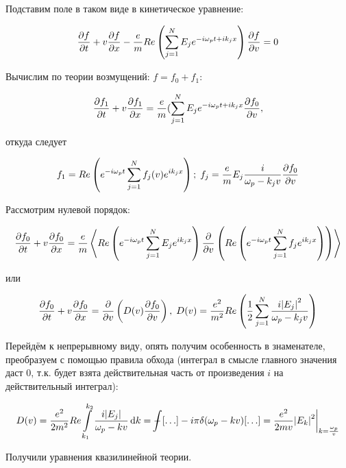 \documentclass[10pt, a4paper]{article}
\def\Xint#1{\mathchoice
 {\XXint\displaystyle\textstyle{#1}}%
 {\XXint\textstyle\scriptstyle{#1}}%
 {\XXint\scriptstyle\scriptscriptstyle{#1}}%
 {\XXint\scriptscriptstyle\scriptscriptstyle{#1}}%
 \!\int}
\def\XXint#1#2#3{{\setbox0=\hbox{$#1{#2#3}{\int}$}
   \vcenter{\hbox{$#2#3$}}\kern-.5\wd0}}
\def\dashint{\Xint-}
\begin{document}
Подставим поле в таком виде в кинетическое уравнение:

\begin{equation*}
	\pdv{f}{t} + v\pdv{f}{x} - \frac{e}{m}Re\left(\sum\limits_{j=1}^N E_je^{-i\omega_pt+ik_jx}\right)\pdv{f}{v} = 0
\end{equation*}

Вычислим по теории возмущений: $f = f_0 + f_1$:

\begin{equation*}
	\pdv{f_1}{t} + v\pdv{f_1}{x} = \frac{e}{m}(\sum\limits_{j=1}^N E_je^{-i\omega_pt+ik_jx}\pdv{f_0}{v},
\end{equation*}

откуда следует

\begin{equation*}
	f_1 = Re \left( e^{-i\omega_p t}\sum\limits_{j=1}^N f_j(v)e^{ik_jx} \right) ;\; f_j = \frac{e}{m}E_j\frac{i}{\omega_p-k_jv} \pdv{f_0}{v}
\end{equation*}

Рассмотрим нулевой порядок:

\begin{equation*}
	\pdv{f_0}{t} + v\pdv{f_0}{x} = \frac{e}{m}\left\langle Re\left( e^{-i\omega_p t}\sum\limits_{j=1}^N E_j e^{ik_jx} \right) \pdv{}{v} \left(Re\left(e^{-i\omega_p t}\sum\limits_{j=1}^N f_je^{ik_j x}\right)\right) \right\rangle 
\end{equation*}

или

\begin{equation*}
	\pdv{f_0}{t} + v\pdv{f_0}{x} = \pdv{}{v}\left(D(v)\pdv{f_0}{v}\right),\; D(v) = \frac{e^2}{m^2}Re\left(\frac{1}{2} \sum\limits_{j=1}^N\frac{i\abs{E_j}^2}{\omega_p-k_jv}\right)
\end{equation*}

Перейдём к непрерывному виду, опять получим особенность в знаменателе, преобразуем с помощью правила обхода (интеграл в смысле главного значения даст 0, т.к. будет взята действительная часть от произведения $i$ на действительный интеграл):

\begin{equation*}
	D(v) = \frac{e^2}{2m^2} Re\int\limits_{k_1}^{k_2} \frac{i\abs{E_j}}{\omega_p-kv}\dd{k} = \dashint[\ldots]-i\pi\delta(\omega_p-kv)[\ldots] = \frac{e^2}{2mv} \abs{E_k}^2\bigg|_{k = \frac{\omega_p}{v}}
\end{equation*}

Получили уравнения квазилинейной теории.
\end{document}
